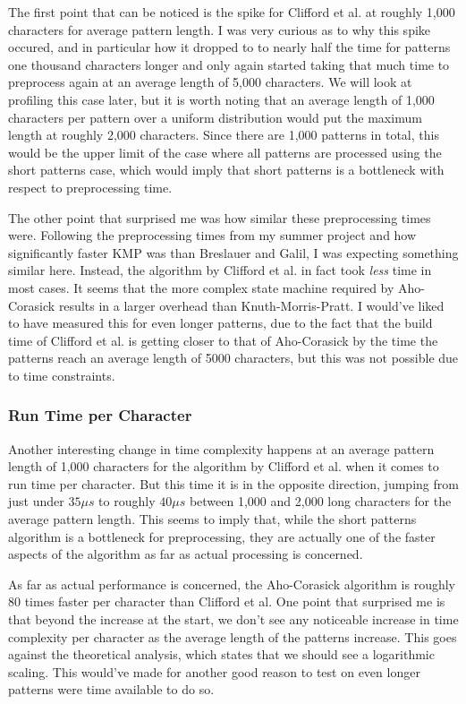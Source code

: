 \documentclass[ %
                    author={Dominic Joseph Moylett},
                    degree={MEng},
                     title={Dictionary Matching with Fingerprints},
                  subtitle={An Empirical Analysis},
                      type={research},
                      year={2015} ]{dissertation}
\begin{document}
The first point that can be noticed is the spike for Clifford et al. at roughly 1,000 characters for average pattern length. I was very curious as to why this spike occured, and in particular how it dropped to to nearly half the time for patterns one thousand characters longer and only again started taking that much time to preprocess again at an average length of 5,000 characters. We will look at profiling this case later, but it is worth noting that an average length of 1,000 characters per pattern over a uniform distribution would put the maximum length at roughly 2,000 characters. Since there are 1,000 patterns in total, this would be the upper limit of the case where all patterns are processed using the short patterns case, which would imply that short patterns is a bottleneck with respect to preprocessing time.

The other point that surprised me was how similar these preprocessing times were. Following the preprocessing times from my summer project and how significantly faster KMP was than Breslauer and Galil, I was expecting something similar here. Instead, the algorithm by Clifford et al. in fact took \textit{less} time in most cases. It seems that the more complex state machine required by Aho-Corasick results in a larger overhead than Knuth-Morris-Pratt. I would've liked to have measured this for even longer patterns, due to the fact that the build time of Clifford et al. is getting closer to that of Aho-Corasick by the time the patterns reach an average length of 5000 characters, but this was not possible due to time constraints.

\subsubsection{Run Time per Character}

Another interesting change in time complexity happens at an average pattern length of 1,000 characters for the algorithm by Clifford et al. when it comes to run time per character. But this time it is in the opposite direction, jumping from just under $35\mu s$ to roughly $40\mu s$ between 1,000 and 2,000 long characters for the average pattern length. This seems to imply that, while the short patterns algorithm is a bottleneck for preprocessing, they are actually one of the faster aspects of the algorithm as far as actual processing is concerned.

As far as actual performance is concerned, the Aho-Corasick algorithm is roughly 80 times faster per character than Clifford et al. One point that surprised me is that beyond the increase at the start, we don't see any noticeable increase in time complexity per character as the average length of the patterns increase. This goes against the theoretical analysis, which states that we should see a logarithmic scaling. This would've made for another good reason to test on even longer patterns were time available to do so.
\end{document}

